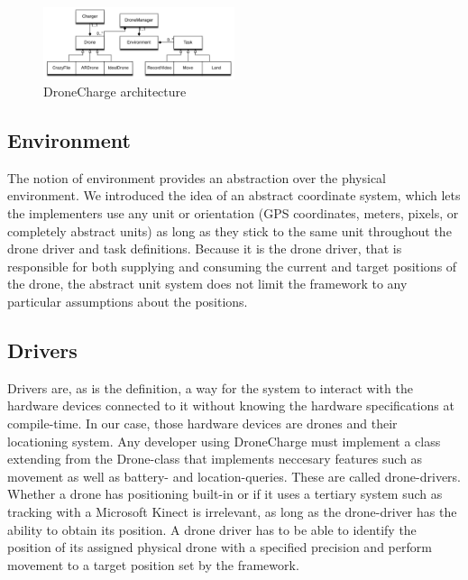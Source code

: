 \begin{figure}[h]
\begin{center}
\includegraphics[width=0.5\textwidth]{images/dronechargearchitecture.png}
\caption{DroneCharge architecture}
\label{fig:architecturefig}
\end{center}
\end{figure}

\subsection{Environment}
The notion of environment provides an abstraction over the physical environment. We introduced the idea of an abstract coordinate system, which lets the implementers use any unit or orientation (GPS coordinates, meters, pixels, or completely abstract units) as long as they stick to the same unit throughout the drone driver and task definitions. Because it is the drone driver, that is responsible for both supplying and consuming the current and target positions of the drone, the abstract unit system does not limit the framework to any particular assumptions about the positions.

\subsection{Drivers}
Drivers are, as is the definition, a way for the system to interact with the hardware devices connected to it without knowing the hardware specifications at compile-time. In our case, those hardware devices are drones and their locationing system. Any developer using DroneCharge must implement a class extending from the Drone-class that implements neccesary features such as movement as well as battery- and location-queries. These are called drone-drivers. Whether a drone has positioning built-in or if it uses a tertiary system such as tracking with a Microsoft Kinect is irrelevant, as long as the drone-driver has the ability to obtain its position. A drone driver has to be able to identify the position of its assigned physical drone with a specified precision and perform movement to a target position set by the framework.

